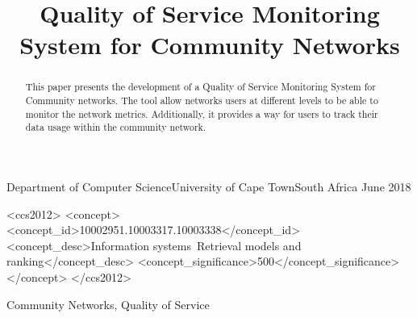 \documentclass[plain]{sigplanconf}
\begin{document}
	\title{Quality of Service Monitoring System for Community Networks}
	{Department of Computer Science\linebreak University of Cape Town\linebreak South Africa}
	{June 2018}
	\maketitle
	\begin{abstract}
		This paper presents the development of a Quality of Service Monitoring System for Community networks.
		The tool allow networks users at different levels to be able to monitor the network metrics.
		Additionally, it provides a way for users to track their data usage within the community network.
	\end{abstract}
	\begin{CCSXML}
		<ccs2012>
		<concept>
		<concept_id>10002951.10003317.10003338</concept_id>
		<concept_desc>Information systems~Retrieval models and ranking</concept_desc>
		<concept_significance>500</concept_significance>
		</concept>
		</ccs2012>
	\end{CCSXML}
	\keywords
	Community Networks, Quality of Service
	
	
	
	
	
	
	
	
	
	
\end{document}
